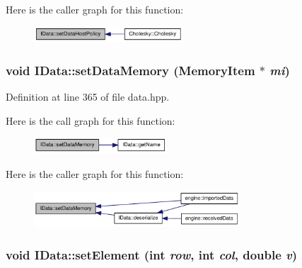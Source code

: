 Here is the caller graph for this function:\nopagebreak
\begin{figure}[H]
\begin{center}
\leavevmode
\includegraphics[width=158pt]{class_i_data_ae65b99c98bd1dcb8c86dd2f8d2a4f9dd_icgraph}
\end{center}
\end{figure}
\hypertarget{class_i_data_a6a6c0f1bebc3a8c52cdd858e29a965f6}{
\subsubsection[{setDataMemory}]{\setlength{\rightskip}{0pt plus 5cm}void IData::setDataMemory ({\bf MemoryItem} $\ast$ {\em mi})}}
\label{class_i_data_a6a6c0f1bebc3a8c52cdd858e29a965f6}


Definition at line 365 of file data.hpp.

Here is the call graph for this function:\nopagebreak
\begin{figure}[H]
\begin{center}
\leavevmode
\includegraphics[width=141pt]{class_i_data_a6a6c0f1bebc3a8c52cdd858e29a965f6_cgraph}
\end{center}
\end{figure}


Here is the caller graph for this function:\nopagebreak
\begin{figure}[H]
\begin{center}
\leavevmode
\includegraphics[width=218pt]{class_i_data_a6a6c0f1bebc3a8c52cdd858e29a965f6_icgraph}
\end{center}
\end{figure}
\hypertarget{class_i_data_a968b912f4fd9053481f2c29c96471efa}{
\subsubsection[{setElement}]{\setlength{\rightskip}{0pt plus 5cm}void IData::setElement (int {\em row}, \/  int {\em col}, \/  double {\em v})}}
\label{class_i_data_a968b912f4fd9053481f2c29c96471efa}


